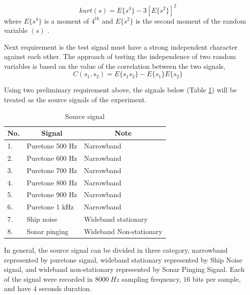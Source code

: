 \documentclass[a4paper]{jpconf}
\begin{document}
\begin{equation} \label{pers:kurt}
kurt(s) = E\{s^4\} - 3[E\{s^2\}]^2
\end{equation}
where $E\{s^4\}$ is a moment of $4^{th}$ and $E\{s^2\}$ is the second moment of the random variable $(s)$ \cite{3}.

Next requirement is the test signal must have a strong independent character against each other. The approach of testing the independence of two random variables is based on the value of the correlation between the two signals,
\begin{equation} \label{pers:corr}
C(s_1,s_2) = E\{s_1 s_2\} - E\{s_1\}E\{s_2\}
\end{equation}

Using two preliminary requirement above, the signals below (Table \ref{table:source}) will be treated as the source signals of the experiment.

\begin{table}[h]
\centering
\caption{Source signal}
\label{table:source}
\begin{tabular}{|l|l|l|}
\hline
\multicolumn{1}{|c|}{No.} & \multicolumn{1}{c|}{Signal} & \multicolumn{1}{c|}{Note} \\ \hline
1.                        & Puretone 500 Hz             & Narrowband                \\ \hline
2.                        & Puretone 600 Hz             & Narrowband                \\ \hline
3.                        & Puretone 700 Hz             & Narrowband                \\ \hline
4.                        & Puretone 800 Hz             & Narrowband                \\ \hline
5.                        & Puretone 900 Hz             & Narrowband                \\ \hline
6.                        & Puretone 1 kHz              & Narrowband                \\ \hline
7.                        & Ship noise                  & Wideband stationary       \\ \hline
8.                        & Sonar pinging               & Wideband Non-stationary   \\ \hline
\end{tabular}
\end{table}

In general, the source signal can be divided in three category, narrowband represented by puretone signal, wideband stationary represented by Ship Noise signal, and wideband non-stationary represented by Sonar Pinging Signal. Each of the signal were recorded in $8000~Hz$ sampling frequency, $16$ bits per sample, and have $4$ seconds duration.
\end{document}
